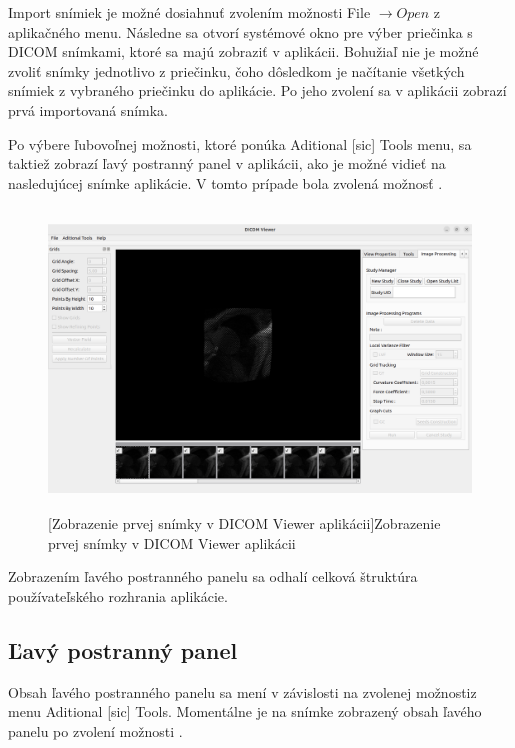 {Import snímiek je možné dosiahnuť zvolením možnosti File $\rightarrow{  Open}$ z aplikačného menu. Následne sa otvorí systémové okno pre výber priečinka s DICOM snímkami, ktoré sa majú zobraziť v aplikácii. Bohužiaľ nie je možné zvoliť snímky jednotlivo z priečinku, čoho dôsledkom je načítanie všetkých snímiek z vybraného priečinku do aplikácie. Po jeho zvolení sa v aplikácii zobrazí prvá importovaná snímka.

Po výbere ľubovoľnej možnosti, ktoré ponúka Aditional [sic] Tools menu, sa taktiež zobrazí ľavý postranný panel v aplikácii, ako je možné vidieť na nasledujúcej snímke aplikácie. V tomto prípade bola zvolená možnosť .

\begin {figure}[ht]
        \centering
        \includegraphics[height=8cm]{media/existing_app/app_with_grids_panel.png}
        \captionsetup{justification=centering}
        [Zobrazenie prvej snímky v DICOM Viewer aplikácii]{Zobrazenie prvej snímky v DICOM Viewer aplikácii}
\end {figure}

Zobrazením ľavého postranného panelu sa odhalí celková štruktúra používateľského rozhrania aplikácie.

\clearpage

\subsection {Ľavý postranný panel}\label{left_sidebar}
Obsah ľavého postranného panelu sa mení v závislosti na zvolenej možnosti\newline z menu Aditional [sic] Tools. Momentálne je na snímke zobrazený obsah ľavého panelu po zvolení možnosti .

}
